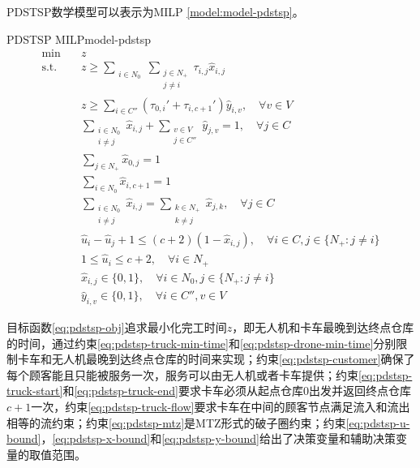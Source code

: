 PDSTSP数学模型可以表示为MILP \ref{model:model-pdstsp}。

{
\newcommand{\mySubstack}[1]{\mathclap{\substack{#1}}}

\begin{model}{PDSTSP MILP}{model-pdstsp}
\begin{align}
    \min \quad & z \label{eq:pdstsp-obj}\\
    \text{s.t.} \quad & z \geq \sum_{\substack{i \in N_0}} \sum_{\substack{j \in N_{+}\\ j\neq i}}\tau_{i,j}\hat{x}_{i,j} \label{eq:pdstsp-truck-min-time}\\
    \quad & z \geq \sum_{i \in C''}(\tau_{0,i}' + \tau_{i, c+1}')\hat{y}_{i,v},\quad \forall v \in V\label{eq:pdstsp-drone-min-time}\\
    \quad & \sum_{\substack{i \in N_0\\ i\neq j}}\hat{x}_{i,j} + \sum_{\substack{v \in V\\ j \in C''}}\hat{y}_{j,v} = 1, \quad \forall j \in C\label{eq:pdstsp-customer}\\
    \quad & \sum_{j \in N_{+}}\hat{x}_{0,j} = 1\label{eq:pdstsp-truck-start}\\
    \quad & \sum_{i \in N_0}\hat{x}_{i,c+1} = 1\label{eq:pdstsp-truck-end}\\
    \quad & \sum_{\substack{i \in N_0\\i \neq j}}\hat{x}_{i,j} = \sum_{\substack{k \in N_{+}\\ k\neq j}}\hat{x}_{j,k}, \quad \forall j \in C\label{eq:pdstsp-truck-flow}\\
    \quad & \hat{u}_i - \hat{u}_j + 1 \leq (c+2)(1 - \hat{x}_{i,j}), \quad \forall i \in C, j \in \{N_{+}:j \neq i\}\label{eq:pdstsp-mtz}\\
    \quad & 1 \leq \hat{u}_i \leq c+2, \quad \forall i \in N_{+}\label{eq:pdstsp-u-bound}\\
    \quad & \hat{x}_{i,j} \in \{0,1\},\quad \forall i \in N_0, j \in \{N_{+}: j\neq i\}\label{eq:pdstsp-x-bound}\\
    \quad & \hat{y}_{i,v} \in \{0,1\},\quad \forall i \in C'', v \in V\label{eq:pdstsp-y-bound}
\end{align}
\end{model}
}

目标函数\ref{eq:pdstsp-obj}追求最小化完工时间$z$，即无人机和卡车最晚到达终点仓库的时间，通过约束\ref{eq:pdstsp-truck-min-time}和\ref{eq:pdstsp-drone-min-time}分别限制卡车和无人机最晚到达终点仓库的时间来实现；约束\ref{eq:pdstsp-customer}确保了每个顾客能且只能被服务一次，服务可以由无人机或者卡车提供；约束\ref{eq:pdstsp-truck-start}和\ref{eq:pdstsp-truck-end}要求卡车必须从起点仓库$0$出发并返回终点仓库$c+1$一次，约束\ref{eq:pdstsp-truck-flow}要求卡车在中间的顾客节点满足流入和流出相等的流约束；约束\ref{eq:pdstsp-mtz}是MTZ形式的破子圈约束；约束\ref{eq:pdstsp-u-bound}，\ref{eq:pdstsp-x-bound}和\ref{eq:pdstsp-y-bound}给出了决策变量和辅助决策变量的取值范围。
